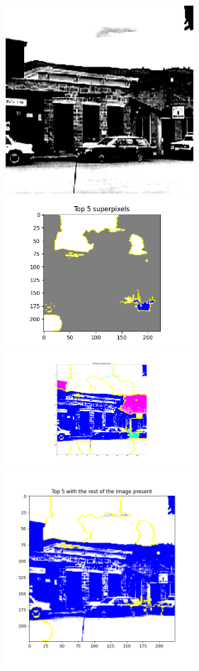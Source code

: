 \begin{figure}[H]
    \includegraphics[width=7cm]{suburb-should-insidecity.png}
    \includegraphics[width=7cm]{lime-suburb-should-insidecity.png}
    \includegraphics[width=7cm]{procon-suburb-should-insidecity.png}
    \includegraphics[width=7cm]{top5-suburb-should-inside-city.png}

\end{figure}
